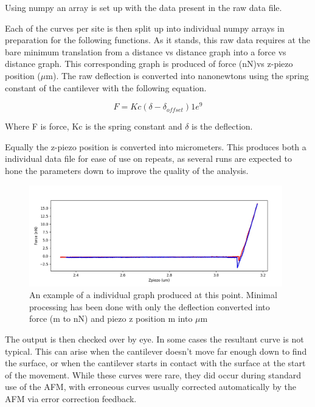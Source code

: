 Using numpy an array is set up with the data present in the raw data file.

Each of the curves per site is then split up into individual numpy arrays in preparation for the following functions. As it stands, this raw data requires at the bare minimum translation from a distance vs distance graph into a force vs distance graph. This corresponding graph is produced of force (nN)vs z-piezo position ($\mu$m). The raw deflection is converted into nanonewtons using the spring constant of the cantilever with the following equation.

\begin{equation}
F = Kc(\delta - \delta _{offset})1e^9
\end{equation}

Where F is force, Kc is the spring constant and $\delta$ is the deflection. %

Equally the z-piezo position is converted into micrometers. This produces both a individual data file for ease of use on repeats, as several runs are expected to hone the parameters down to improve the quality of the analysis.  

\begin{figure}[h!]     %
        \begin{center}
          \includegraphics[width=110mm]{chapter4/EgRawGraph.jpg}
\end{center}
\caption{An example of a individual graph produced at this point. Minimal processing has been done with only the deflection converted into force (m to nN) and piezo z position m into $\mu$m}
\label{fig:EgRawGraph}                 %
\end{figure}

The output is then checked over by eye. In some cases the resultant curve is not typical. This can arise when the cantilever doesn't move far enough down to find the surface, or when the cantilever starts in contact with the surface at the start of the movement. While these curves were rare, they did occur during standard use of the AFM, with erroneous curves usually corrected automatically by the AFM via error correction feedback. 

